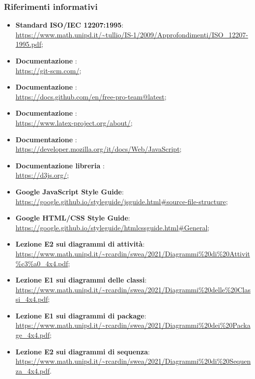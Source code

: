 \subsubsection{Riferimenti informativi}
\begin{itemize}
    \item \textbf{Standard ISO/IEC 12207:1995}: \\
    \url{https://www.math.unipd.it/~tullio/IS-1/2009/Approfondimenti/ISO_12207-1995.pdf};
    \item \textbf{Documentazione }: \\
    \url{https://git-scm.com/};
    \item \textbf{Documentazione }: \\
    \url{https://docs.github.com/en/free-pro-team@latest};
    \item \textbf{Documentazione \glossario{\LaTeX}}: \\
    \url{https://www.latex-project.org/about/};
    \item \textbf{Documentazione }: \\
    \url{https://developer.mozilla.org/it/docs/Web/JavaScript};
    \item \textbf{Documentazione libreria }: \\
    \url{https://d3js.org/};
	\item \textbf{Google JavaScript Style Guide}: \\
	\url{https://google.github.io/styleguide/jsguide.html#source-file-structure};
	\item \textbf{Google HTML/CSS Style Guide}: \\
	\url{https://google.github.io/styleguide/htmlcssguide.html#General};
    \item \textbf{Lezione E2 sui diagrammi di attività}: \\
	\url{https://www.math.unipd.it/~rcardin/swea/2021/Diagrammi%20di%20Attivit%c3%a0_4x4.pdf};
    \item \textbf{Lezione E1 sui diagrammi delle classi}: \\
	\url{https://www.math.unipd.it/~rcardin/swea/2021/Diagrammi%20delle%20Classi_4x4.pdf};
    \item \textbf{Lezione E1 sui diagrammi di package}: \\
	\url{https://www.math.unipd.it/~rcardin/swea/2021/Diagrammi%20dei%20Package_4x4.pdf};
    \item \textbf{Lezione E2 sui diagrammi di sequenza}: \\
	\url{https://www.math.unipd.it/~rcardin/swea/2021/Diagrammi%20di%20Sequenza_4x4.pdf}.
\end{itemize}
